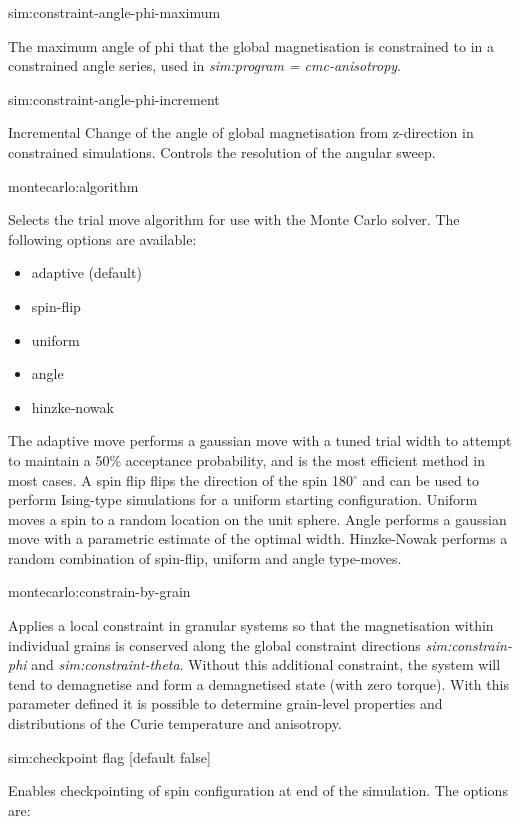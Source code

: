 {\zicf sim:constraint-angle-phi-maximum} The maximum angle of phi that the global magnetisation is constrained to in a constrained angle series, used in \textit{sim:program = cmc-anisotropy}.

{\zicf sim:constraint-angle-phi-increment} Incremental Change of the angle of global magnetisation from z-direction in constrained simulations. Controls the resolution of the angular sweep.

{\zicf montecarlo:algorithm}
Selects the trial move algorithm for use with the Monte Carlo solver. The
following options are available:

\begin{itemize}
  \item[] adaptive (default)
  \item[] spin-flip
  \item[] uniform
  \item[] angle
  \item[] hinzke-nowak
\end{itemize}

The adaptive move performs a gaussian move with a tuned trial width to attempt
to maintain a 50\% acceptance probability, and is the most efficient method in
most cases. A spin flip flips the direction of the spin 180$^{\circ}$ and can be
used to perform Ising-type simulations for a uniform starting configuration.
Uniform moves a spin to a random location on the unit sphere. Angle performs a
gaussian move with a parametric estimate of the optimal width. Hinzke-Nowak
performs a random combination of spin-flip, uniform and angle type-moves.

{\zicf montecarlo:constrain-by-grain}
Applies a local constraint in granular systems so that the magnetisation within
individual grains is conserved along the global constraint directions
\textit{sim:constrain-phi} and \textit{sim:constraint-theta}. Without this
additional constraint, the system will tend to demagnetise and form a
demagnetised state (with zero torque). With this parameter defined it is
possible to determine grain-level properties and distributions of the Curie
temperature and anisotropy.

{\zicf sim:checkpoint flag [default false]} Enables checkpointing of spin configuration at end of the simulation. The options are:

